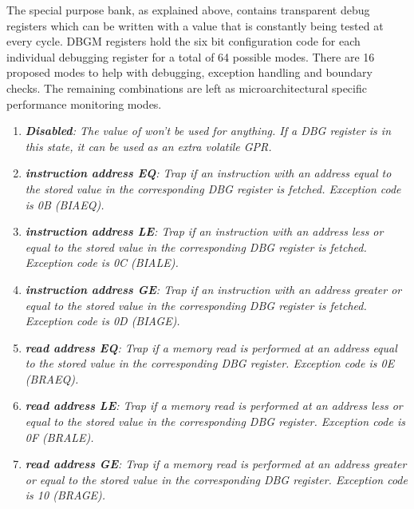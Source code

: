 \documentclass{article}
\begin{document}
                \vspace{10pt}

                The special purpose bank, as explained above, contains transparent debug registers which can be written with a value that is constantly being tested at every cycle. DBGM registers hold the six bit configuration code for each individual debugging register for a total of 64 possible modes. There are 16 proposed modes to help with debugging, exception handling and boundary checks. The remaining combinations are left as microarchitectural specific performance monitoring modes.

                \begin{enumerate}

                    \item \textit{\textbf{Disabled}: The value of won't be used for anything. If a DBG register is in this state, it can be used as an extra volatile GPR.}

                    \item \textit{\textbf{instruction address EQ}: Trap if an instruction with an address equal to the stored value in the corresponding DBG register is fetched. Exception code is 0B (BIAEQ).}

                    \item \textit{\textbf{instruction address LE}: Trap if an instruction with an address less or equal to the stored value in the corresponding DBG register is fetched. Exception code is 0C (BIALE).}

                    \item \textit{\textbf{instruction address GE}: Trap if an instruction with an address greater or equal to the stored value in the corresponding DBG register is fetched. Exception code is 0D (BIAGE).}

                    \item \textit{\textbf{read address EQ}: Trap if a memory read is performed at an address equal to the stored value in the corresponding DBG register. Exception code is 0E (BRAEQ).}

                    \item \textit{\textbf{read address LE}: Trap if a memory read is performed at an address less or equal to the stored value in the corresponding DBG register. Exception code is 0F (BRALE).}

                    \item \textit{\textbf{read address GE}: Trap if a memory read is performed at an address greater or equal to the stored value in the corresponding DBG register. Exception code is 10 (BRAGE).}


\end{enumerate}
\end{document}
